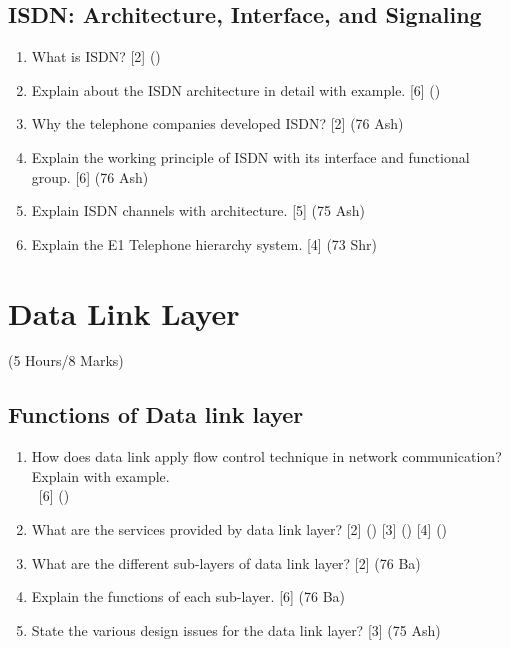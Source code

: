 \documentclass[12pt]{article}
\newcommand{\enter}{\\\textcolor{white}{1}}
\begin{document}
	\subsection{ISDN: Architecture, Interface, and Signaling}
		\begin{enumerate}[noitemsep, topsep=0pt]
			\item What is ISDN? \hfill [2] ()
			
			\item Explain about the ISDN architecture in detail with example. \hfill [6] ()
			
			\item Why the telephone companies developed ISDN? \hfill [2] (76 Ash)
			
			\item Explain the working principle of ISDN with its interface and functional group. \hfill [6] (76 Ash)
			
			\item Explain ISDN channels with architecture. \hfill [5] (75 Ash)
			
			\item Explain the E1 Telephone hierarchy system. \hfill [4] (73 Shr)
		\end{enumerate}

	\pagebreak

\section{Data Link Layer}
	\begin{center}(5 Hours/8 Marks)\end{center}
	\subsection{Functions of Data link layer}
		\begin{enumerate}[noitemsep, topsep=0pt]
			\item How does data link apply flow control technique in network communication? Explain with example.
			\enter\hfill [6] ()

			\item What are the services provided by data link layer? \hfill [2] () [3] () [4] () 

			\item What are the different sub-layers of data link layer? \hfill [2] (76 Ba)

			\item Explain the functions of each sub-layer. \hfill [6] (76 Ba)

			\item State the various design issues for the data link layer? \hfill [3] (75 Ash)
		\end{enumerate}
		
\end{document}
